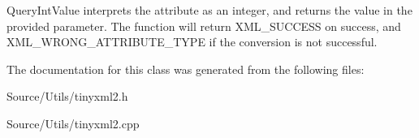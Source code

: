 Query\+Int\+Value interprets the attribute as an integer, and returns the value in the provided parameter. The function will return X\+M\+L\+\_\+\+S\+U\+C\+C\+E\+SS on success, and X\+M\+L\+\_\+\+W\+R\+O\+N\+G\+\_\+\+A\+T\+T\+R\+I\+B\+U\+T\+E\+\_\+\+T\+Y\+PE if the conversion is not successful. 

The documentation for this class was generated from the following files\+:\begin{DoxyCompactItemize}
\item 
Source/\+Utils/tinyxml2.\+h\item 
Source/\+Utils/tinyxml2.\+cpp\end{DoxyCompactItemize}
